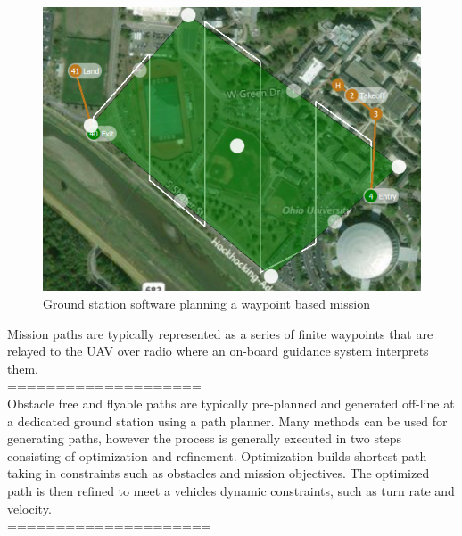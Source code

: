 \documentclass[numbered,pdftex]{ohio-etd}
\begin{document}
\begin{figure}[H]
	\centering
	\includegraphics[width=12cm]{PaperFigures/Literature/groundStationPlanning}
	\caption{Ground station software planning a waypoint based mission}
	\label{fig:groundstationplanning}
\end{figure}

Mission paths are typically represented as a series of finite waypoints that are relayed to the UAV over radio where an on-board guidance system interprets them.\\

====================\\
Obstacle free and flyable paths are typically pre-planned and generated off-line at a dedicated ground station using a path planner. Many methods can be used for generating paths, however the process is generally executed in two steps consisting of optimization and refinement. Optimization builds shortest path taking in constraints such as obstacles and mission objectives. The optimized path is then refined to meet a vehicles dynamic constraints, such as turn rate and velocity. \\
=====================\\
\end{document}
